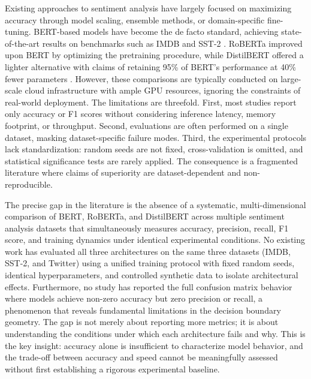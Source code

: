 \documentclass[conference]{IEEEtran}
\begin{document}
Existing approaches to sentiment analysis have largely focused on maximizing accuracy through model scaling, ensemble methods, or domain-specific fine-tuning. BERT-based models have become the de facto standard, achieving state-of-the-art results on benchmarks such as IMDB and SST-2 \cite{r4}. RoBERTa improved upon BERT by optimizing the pretraining procedure, while DistilBERT offered a lighter alternative with claims of retaining 95\% of BERT's performance at 40\% fewer parameters \cite{r5}. However, these comparisons are typically conducted on large-scale cloud infrastructure with ample GPU resources, ignoring the constraints of real-world deployment. The limitations are threefold. First, most studies report only accuracy or F1 scores without considering inference latency, memory footprint, or throughput. Second, evaluations are often performed on a single dataset, masking dataset-specific failure modes. Third, the experimental protocols lack standardization: random seeds are not fixed, cross-validation is omitted, and statistical significance tests are rarely applied. The consequence is a fragmented literature where claims of superiority are dataset-dependent and non-reproducible.

The precise gap in the literature is the absence of a systematic, multi-dimensional comparison of BERT, RoBERTa, and DistilBERT across multiple sentiment analysis datasets that simultaneously measures accuracy, precision, recall, F1 score, and training dynamics under identical experimental conditions. No existing work has evaluated all three architectures on the same three datasets (IMDB, SST-2, and Twitter) using a unified training protocol with fixed random seeds, identical hyperparameters, and controlled synthetic data to isolate architectural effects. Furthermore, no study has reported the full confusion matrix behavior where models achieve non-zero accuracy but zero precision or recall, a phenomenon that reveals fundamental limitations in the decision boundary geometry. The gap is not merely about reporting more metrics; it is about understanding the conditions under which each architecture fails and why. This is the key insight: accuracy alone is insufficient to characterize model behavior, and the trade-off between accuracy and speed cannot be meaningfully assessed without first establishing a rigorous experimental baseline.
\end{document}
